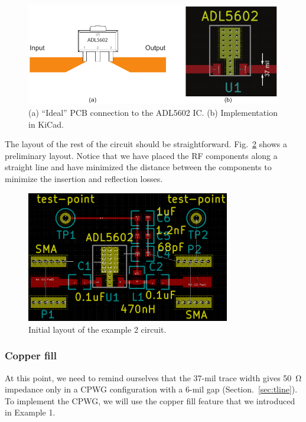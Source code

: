 \documentclass[12pt,letterpaper]{scrartcl}
\begin{document}
\begin{figure}[ph]
	\centering
	\includegraphics{adl5602-connection}
	\caption{(a) ``Ideal'' PCB connection to the ADL5602 IC. (b) Implementation in KiCad.}
	\label{fig:adl5602-connection}
\end{figure}


The layout of the rest of the circuit should be straightforward. Fig.~\ref{fig:example2-layout-prelim} shows a preliminary layout. Notice that we have placed the RF components along a straight line and have minimized the distance between the components to minimize the insertion and reflection losses. 

\begin{figure}[ht]
	\centering
	\includegraphics[width=3.5in]{example2-layout-prelim}
	\caption{Initial layout of the example 2 circuit.}
	\label{fig:example2-layout-prelim}
\end{figure}

\subsubsection{Copper fill}
At this point, we need to remind ourselves that the 37-mil trace width gives \SI{50}{\ohm} impedance only in a CPWG configuration with a 6-mil gap (Section.~\ref{sec:tline}). To implement the CPWG, we will use the copper fill feature that we introduced in Example 1. 
\end{document}
